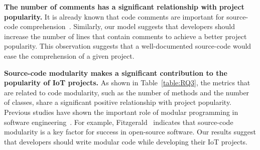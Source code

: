 \textbf{The number of comments has a significant relationship with project popularity.} It is already known that code comments are
important for source-code comprehension~\cite{steidl2013quality}.
Similarly, our model suggests that developers should increase the number of
lines that contain comments to achieve a better project popularity. This
observation suggests that a well-documented source-code would ease the
comprehension of a given project.

\textbf{Source-code modularity makes a significant contribution to the popularity of IoT projects.} As shown in Table~\ref{table:RQ3}, the metrics
that are related to code modularity, such as the number of methods and the number of classes, share a significant positive relationship with project popularity. Previous studies have shown the important role of modular
programming in software
engineering~\cite{fitzgerald2004critical,aberdour2007achieving,moon1986object}.
For example, Fitzgerald~\cite{fitzgerald2004critical} indicates that source-code modularity is a key factor for success in open-source software. Our
results suggest that developers should write modular code while developing
their IoT projects.


